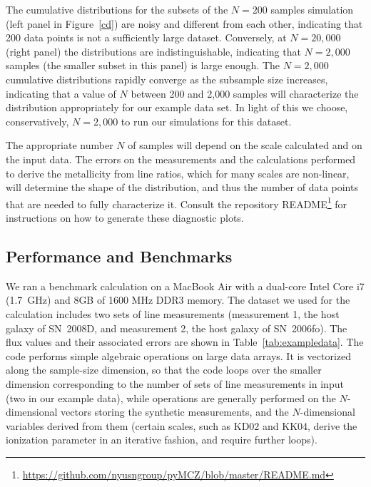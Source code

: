 \documentclass{emulateapj}
\begin{document}
The cumulative distributions for the subsets of the $N=200$ samples simulation (left panel in Figure~\ref{cd}) are noisy and different from each other, indicating that 200 data points is not a sufficiently large dataset. Conversely, at $N=20,000$ (right panel) the distributions are indistinguishable, indicating that $N=2,000$ samples (the smaller subset in this panel) is large enough. The $N=2,000$ cumulative distributions rapidly converge as the subsample size increases, indicating that a value of $N$ between 200 and 2,000 samples will characterize the distribution appropriately for our example data set.  In light of this we choose, conservatively, $N=2,000$ to run our simulations for this dataset. 

The appropriate number $N$ of samples will depend on the scale calculated and on the  input data. The errors on the measurements and the calculations performed to derive the metallicity from line ratios, which for many scales are non-linear, will determine the shape of the distribution, and thus the number of data points that are needed to fully characterize it. Consult the repository README\footnote{\url{https://github.com/nyusngroup/pyMCZ/blob/master/README.md}} for instructions on how to generate these diagnostic plots.

\subsection{Performance and Benchmarks}
We ran a benchmark calculation on a MacBook Air with a dual-core Intel Core i7 (1.7~GHz) and 8GB of 1600 MHz DDR3 memory. The dataset we used for the calculation includes two sets of line measurements (measurement 1, the host galaxy of SN~2008D, and measurement 2, the host galaxy of SN~2006fo). The flux values and their associated errors are shown in Table~\ref{tab:exampledata}. The code performs simple algebraic operations on large data arrays. It is vectorized along the sample-size dimension, so that the code loops over the smaller dimension corresponding to the number of sets of line measurements in input (two in our example data), while operations are generally performed on the $N$-dimensional vectors storing the synthetic measurements, and the $N$-dimensional variables derived from them (certain scales, such as KD02 and KK04, derive the ionization parameter in an iterative fashion, and require further loops).
\end{document}
